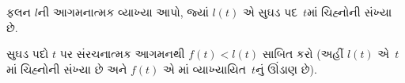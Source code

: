 \documentclass[../../../include/open-logic-section]{subfiles}
\begin{document}
\begin{prob}
  ફલન $l$ની આગમનાત્મક વ્યાખ્યા આપો, જ્યાં
  $l(t)$ એ સુઘડ પદ~$t$માં ચિહ્નોની સંખ્યા છે.
\end{prob}

\begin{prob}
  સુઘડ પદો $t$ પર સંરચનાત્મક આગમનથી
  $f(t) < l(t)$ સાબિત કરો (અહીં $l(t)$
  એ~$t$માં ચિહ્નોની સંખ્યા છે અને $f(t)$
  એ માં
  વ્યાખ્યાયિત~$t$નું ઊંડાણ છે).
\end{prob}
\end{document}
